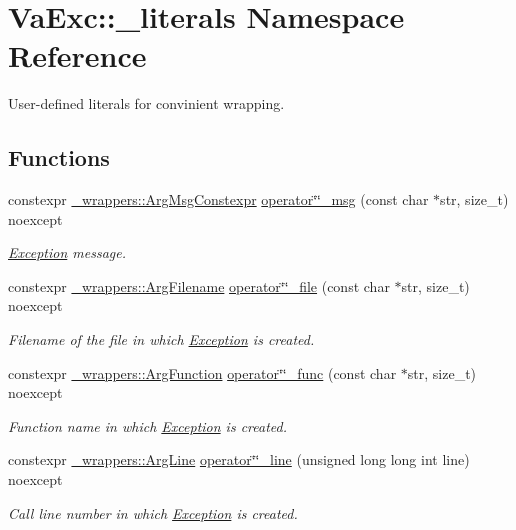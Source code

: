 \hypertarget{namespace_va_exc_1_1__literals}{}\section{Va\+Exc\+:\+:\+\_\+literals Namespace Reference}
\label{namespace_va_exc_1_1__literals}


User-\/defined literals for convinient wrapping.  


\subsection*{Functions}
\begin{DoxyCompactItemize}
\item 
constexpr \hyperlink{struct_va_exc_1_1__wrappers_1_1_arg_msg_constexpr}{\+\_\+wrappers\+::\+Arg\+Msg\+Constexpr} \hyperlink{namespace_va_exc_1_1__literals_a9fd72d243b5f2b1d7d41d64c399e0368}{operator\char`\"{}\char`\"{}\+\_\+msg} (const char $\ast$str, size\+\_\+t) noexcept
\begin{DoxyCompactList}\small\item\em \hyperlink{class_va_exc_1_1_exception}{Exception} message. \end{DoxyCompactList}\item 
constexpr \hyperlink{struct_va_exc_1_1__wrappers_1_1_arg_filename}{\+\_\+wrappers\+::\+Arg\+Filename} \hyperlink{namespace_va_exc_1_1__literals_a8655907b7dc8b4d18a7c9dad04355d81}{operator\char`\"{}\char`\"{}\+\_\+file} (const char $\ast$str, size\+\_\+t) noexcept
\begin{DoxyCompactList}\small\item\em Filename of the file in which \hyperlink{class_va_exc_1_1_exception}{Exception} is created. \end{DoxyCompactList}\item 
constexpr \hyperlink{struct_va_exc_1_1__wrappers_1_1_arg_function}{\+\_\+wrappers\+::\+Arg\+Function} \hyperlink{namespace_va_exc_1_1__literals_ae8ad698ba9e4abcd965c1c2e38fc4ff6}{operator\char`\"{}\char`\"{}\+\_\+func} (const char $\ast$str, size\+\_\+t) noexcept
\begin{DoxyCompactList}\small\item\em Function name in which \hyperlink{class_va_exc_1_1_exception}{Exception} is created. \end{DoxyCompactList}\item 
constexpr \hyperlink{struct_va_exc_1_1__wrappers_1_1_arg_line}{\+\_\+wrappers\+::\+Arg\+Line} \hyperlink{namespace_va_exc_1_1__literals_a3dbcc12c461e252ba8a515078da4eabe}{operator\char`\"{}\char`\"{}\+\_\+line} (unsigned long long int line) noexcept
\begin{DoxyCompactList}\small\item\em Call line number in which \hyperlink{class_va_exc_1_1_exception}{Exception} is created. \end{DoxyCompactList}\end{DoxyCompactItemize}


